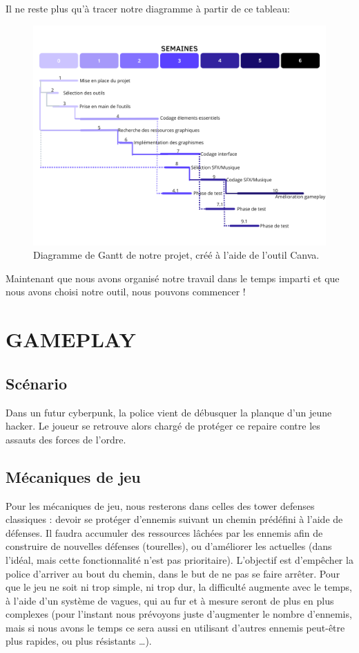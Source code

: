 \documentclass{article}
\begin{document}
Il ne reste plus qu'à tracer notre diagramme à partir de ce tableau:
\vspace{-10pt}
\begin{figure}[h]
    \centering
    \includegraphics[width=1\textwidth]{diagram_gantt.png}
    \caption{Diagramme de Gantt de notre projet, créé à l'aide de l'outil Canva.}
    \label{fig:diagram_gantt.png}
\end{figure}

\noindent Maintenant que nous avons organisé notre travail dans le temps imparti et que nous avons choisi notre outil, nous pouvons commencer !

\newpage

\section*{GAMEPLAY}

\subsection*{Scénario}
Dans un futur cyberpunk, la police vient de débusquer la planque d'un jeune hacker. Le joueur se retrouve alors chargé de protéger ce repaire contre les assauts des forces de l'ordre.

\subsection*{Mécaniques de jeu}
Pour les mécaniques de jeu, nous resterons dans celles des tower defenses classiques : devoir se protéger d'ennemis suivant un chemin prédéfini à l’aide de défenses. Il faudra accumuler des ressources lâchées par les ennemis afin de construire de nouvelles défenses (tourelles), ou d'améliorer les actuelles (dans l'idéal, mais cette fonctionnalité n’est pas prioritaire). L’objectif est d'empêcher la police d’arriver au bout du chemin, dans le but de ne pas se faire arrêter. Pour que le jeu ne soit ni trop simple, ni trop dur, la difficulté augmente avec le temps, à l’aide d’un système de vagues, qui au fur et à mesure seront de plus en plus complexes (pour l’instant nous prévoyons juste d’augmenter le nombre d'ennemis, mais si nous avons le temps ce sera aussi en utilisant d’autres ennemis peut-être plus rapides, ou plus résistants …).
\end{document}
